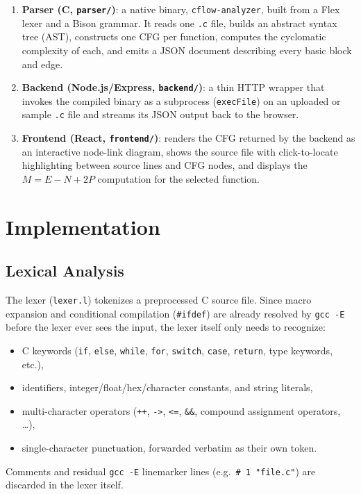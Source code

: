 \documentclass[11pt]{article}
\begin{document}
\begin{enumerate}
    \item \textbf{Parser (C, \texttt{parser/})}: a native binary, \texttt{cflow-analyzer}, built from a Flex lexer and a Bison grammar. It reads one \texttt{.c} file, builds an abstract syntax tree (AST), constructs one CFG per function, computes the cyclomatic complexity of each, and emits a JSON document describing every basic block and edge.
    \item \textbf{Backend (Node.js/Express, \texttt{backend/})}: a thin HTTP wrapper that invokes the compiled binary as a subprocess (\texttt{execFile}) on an uploaded or sample \texttt{.c} file and streams its JSON output back to the browser.
    \item \textbf{Frontend (React, \texttt{frontend/})}: renders the CFG returned by the backend as an interactive node-link diagram, shows the source file with click-to-locate highlighting between source lines and CFG nodes, and displays the $M = E - N + 2P$ computation for the selected function.
\end{enumerate}

\section{Implementation}

\subsection{Lexical Analysis}
The lexer (\texttt{lexer.l}) tokenizes a preprocessed C source file. Since macro expansion and conditional compilation (\texttt{\#ifdef}) are already resolved by \texttt{gcc -E} before the lexer ever sees the input, the lexer itself only needs to recognize:
\begin{itemize}
    \item C keywords (\texttt{if}, \texttt{else}, \texttt{while}, \texttt{for}, \texttt{switch}, \texttt{case}, \texttt{return}, type keywords, etc.),
    \item identifiers, integer/float/hex/character constants, and string literals,
    \item multi-character operators (\texttt{++}, \texttt{->}, \texttt{<=}, \texttt{\&\&}, compound assignment operators, \ldots),
    \item single-character punctuation, forwarded verbatim as their own token.
\end{itemize}
Comments and residual \texttt{gcc -E} linemarker lines (e.g.\ \texttt{\# 1 "file.c"}) are discarded in the lexer itself.
\end{document}
